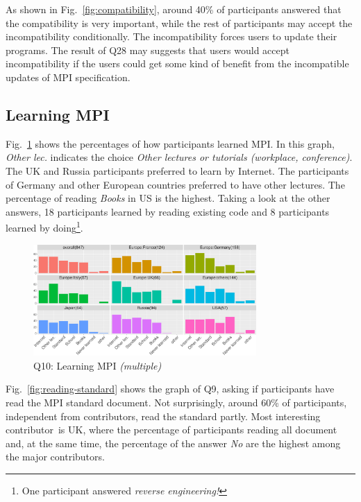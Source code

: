 \documentclass[preprint,5p,times]{elsarticle}
\def\myquote#1{{\it #1}}
\def\country{contributor}%
\def\countries{contributors}%
\def\mcountries{major contributors\xspace{}}%
\begin{document}
As shown in Fig.~\ref{fig:compatibility}, around 40\% of participants
answered that the compatibility is very important, while the rest of
participants may accept the incompatibility conditionally. The
incompatibility forces users to update their programs. The result of
Q28 may suggests that users would accept incompatibility if the users
could get some kind of benefit from the incompatible updates of MPI
specification.

\subsection{Learning MPI}\label{sec:learning-mpi}

Fig.~\ref{fig:learning-mpi} shows the percentages of how participants
learned MPI. In this graph, \myquote{Other lec.} indicates the choice
\myquote{Other lectures or tutorials (workplace, conference)}. The
UK and Russia participants preferred to learn by Internet. The
participants of Germany and other European countries preferred to have
other lectures. The percentage of reading \myquote{Books} in US is the
highest. Taking a look at the other answers, 18 participants learned
by reading existing code and 8 participants learned by
doing\footnote{One participant answered \myquote{reverse engineering!}}.

\begin{figure}[htb]
\begin{center}
\includegraphics[width=8.5cm]{R-scripts/Q10.pdf}
\caption{Q10: Learning MPI {\it(multiple)}}
\label{fig:learning-mpi}
\end{center}
\end{figure}

Fig.~\ref{fig:reading-standard} shows the graph of Q9, asking if
participants have read the MPI standard document. Not surprisingly,
around 60\% of participants, independent from \countries, read the
standard partly. Most interesting \country\  is UK, where the percentage
of participants reading all document and, at the same time, the
percentage of the answer \myquote{No} are the highest among the
\mcountries.
\end{document}
